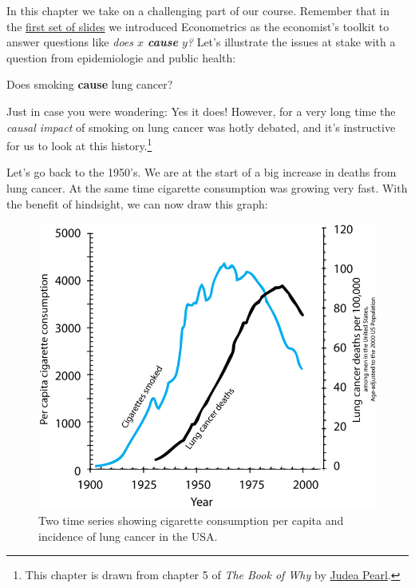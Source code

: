 \documentclass[]{book}
\newenvironment{warning}{\begin{tcolorbox}[colback=orange!5!white,colframe=orange]}{\end{tcolorbox}}
\begin{document}
In this chapter we take on a challenging part of our course. Remember that in the \href{https://rawcdn.githack.com/ScPoEcon/ScPoEconometrics-Slides/session2_1/chapter1/chapter1.html}{first set of slides} we introduced Econometrics as the economist's toolkit to answer questions like \emph{does \(x\) \textbf{cause} \(y\)?} Let's illustrate the issues at stake with a question from epidemiologie and public health:

\begin{warning}
Does smoking \textbf{cause} lung cancer?
\end{warning}

Just in case you were wondering: Yes it does! However, for a very long time the \emph{causal impact} of smoking on lung cancer was hotly debated, and it's instructive for us to look at this history.\footnote{This chapter is drawn from chapter 5 of \emph{The Book of Why} by \href{http://bayes.cs.ucla.edu/jp_home.html}{Judea Pearl}.}

Let's go back to the 1950's. We are at the start of a big increase in deaths from lung cancer. At the same time cigarette consumption was growing very fast. With the benefit of hindsight, we can now draw this graph:

\begin{figure}

{\centering \includegraphics[width=9.86in]{images/Smoking_lung_cancer} 

}

\caption{Two time series showing cigarette consumption per capita and incidence of lung cancer in the USA.}\label{fig:smoking-cancer}
\end{figure}
\end{document}
